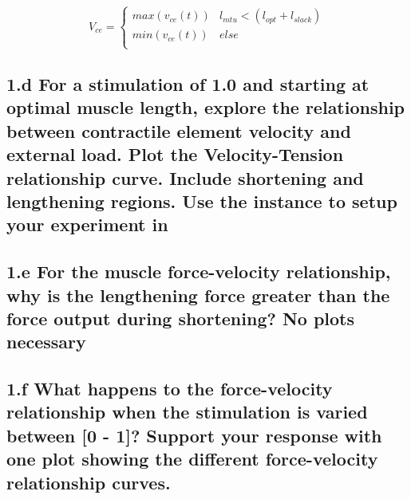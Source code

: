 \documentclass{cmc}
\begin{document}
\begin{equation}
  \label{eq:2}
 V_{ce} = \left\{
\begin{array}{ll}
      max(v_{ce}(t)) & l_{mtu} < (l_{opt} + l_{slack}) \\
      min(v_{ce}(t)) & else \\
\end{array}
\right.
\end{equation}

\subsection*{1.d For a stimulation of 1.0 and starting at optimal
  muscle length, explore the relationship between contractile element
  velocity and external load. Plot the Velocity-Tension relationship
  curve. Include shortening and lengthening regions. Use the
   instance
  to setup your experiment in }

\subsection*{1.e For the muscle force-velocity relationship, why is
  the lengthening force greater than the force output during
  shortening? No plots necessary}


\subsection*{1.f What happens to the force-velocity relationship
  when the stimulation is varied between [0 - 1]? Support your
  response with one plot showing the different force-velocity
  relationship curves.  }
\end{document}
